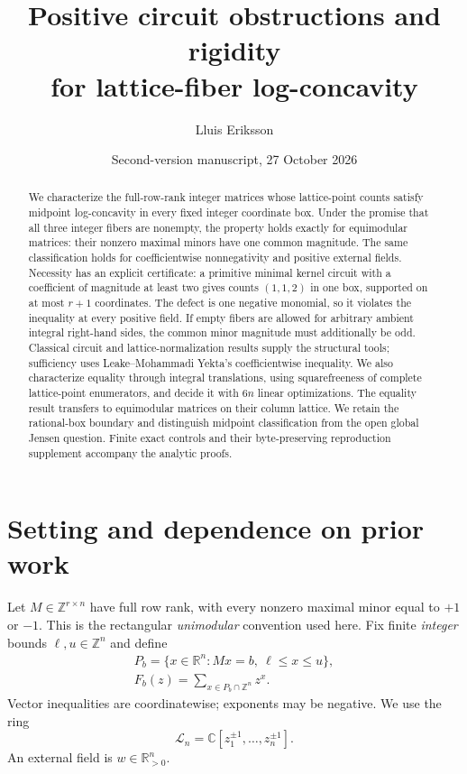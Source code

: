 \documentclass[11pt]{article}
\title{Positive circuit obstructions and rigidity\\for lattice-fiber log-concavity}
\author{Lluis Eriksson}
\date{Second-version manuscript, 27 October 2026}
\newcommand{\Z}{\mathbb Z}\newcommand{\R}{\mathbb R}\newcommand{\C}{\mathbb C}
\begin{document}
\maketitle
\begin{abstract}
We characterize the full-row-rank integer matrices whose lattice-point counts satisfy midpoint log-concavity in every fixed integer coordinate box. Under the promise that all three integer fibers are nonempty, the property holds exactly for equimodular matrices: their nonzero maximal minors have one common magnitude. The same classification holds for coefficientwise nonnegativity and positive external fields. Necessity has an explicit certificate: a primitive minimal kernel circuit with a coefficient of magnitude at least two gives counts \((1,1,2)\) in one box, supported on at most \(r+1\) coordinates. The defect is one negative monomial, so it violates the inequality at every positive field. If empty fibers are allowed for arbitrary ambient integral right-hand sides, the common minor magnitude must additionally be odd. Classical circuit and lattice-normalization results supply the structural tools; sufficiency uses Leake--Mohammadi Yekta's coefficientwise inequality. We also characterize equality through integral translations, using squarefreeness of complete lattice-point enumerators, and decide it with \(6n\) linear optimizations. The equality result transfers to equimodular matrices on their column lattice. We retain the rational-box boundary and distinguish midpoint classification from the open global Jensen question. Finite exact controls and their byte-preserving reproduction supplement accompany the analytic proofs.
\end{abstract}

\section{Setting and dependence on prior work}
Let \(M\in\Z^{r\times n}\) have full row rank, with every nonzero maximal minor equal to \(+1\) or \(-1\). This is the rectangular \emph{unimodular} convention used here. Fix finite \emph{integer} bounds \(\ell,u\in\Z^n\) and define
\[
\begin{gathered}
P_b=\{x\in\R^n:Mx=b,\ \ell\le x\le u\},\\
F_b(z)=\sum_{x\in P_b\cap\Z^n}z^x.
\end{gathered}
\]
Vector inequalities are coordinatewise; exponents may be negative. We use the ring
\[\mathcal L_n=\C[z_1^{\pm1},\ldots,z_n^{\pm1}].\]
An external field is \(w\in\R_{>0}^n\).
\end{document}
